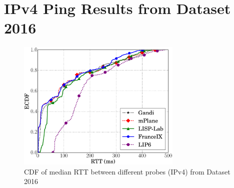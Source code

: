 \section{IPv4 Ping Results from Dataset 2016}
\label{sec:pxtr_ping_v4_2016}


\begin{figure}[!t]
	\centering
	\includegraphics[width=0.7\textwidth]{Pics/v4/CDF_avg(RTT)_median_4_20.eps}
	\caption{CDF of median RTT between different probes (IPv4) from Dataset 2016}
	\label{CDF_of_median_RTT_between_different_probes_v4_2016}
\end{figure}


